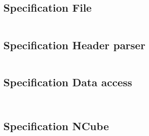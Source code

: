 \documentclass[a4paper,10pt]{article}
\begin{document}
\subsection{Specification File}
\inputminted{ada}{../lib/src/file.ads}

\subsection{Specification Header parser}
\inputminted{ada}{../lib/src/parser/strict.ads}

\subsection{Specification Data access}
\inputminted{ada}{../lib/src/data/generic_data_value.ads}
\inputminted{ada}{../lib/src/data/generic_data_unit.ads}

\subsection{Specification NCube}
\inputminted{ada}{../lib/src/ncube/ncube_funcs.ads}
\inputminted{ada}{../lib/src/ncube/ncube.ads}






\end{document}
